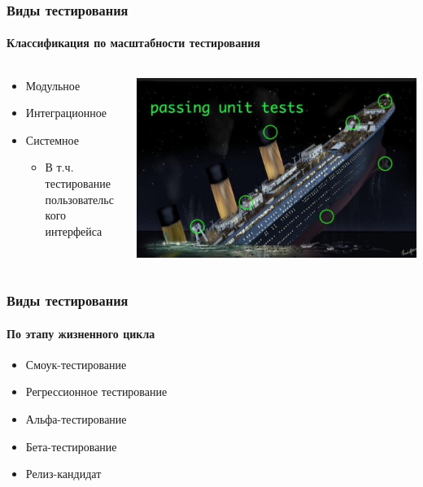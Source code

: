\documentclass{../../slides-style}
\begin{document}
    \begin{frame}
        \frametitle{Виды тестирования}
        \framesubtitle{Классификация по масштабности тестирования}
        \begin{columns}
            \begin{column}{0.4\textwidth}
                \begin{itemize}
                    \item Модульное
                    \item Интеграционное
                    \item Системное
                    \begin{itemize}
                        \item В т.ч. тестирование пользовательского интерфейса
                    \end{itemize}
                \end{itemize}
            \end{column}
            \begin{column}{0.6\textwidth}
                \begin{center}
                    \includegraphics[width=\textwidth]{titanic.png}
                \end{center}
            \end{column}
        \end{columns}
    \end{frame}

    \begin{frame}
        \frametitle{Виды тестирования}
        \framesubtitle{По этапу жизненного цикла}
        \begin{itemize}
            \item Смоук-тестирование
            \item Регрессионное тестирование
            \item Альфа-тестирование
            \item Бета-тестирование
            \item Релиз-кандидат
        \end{itemize}
    \end{frame}
\end{document}
